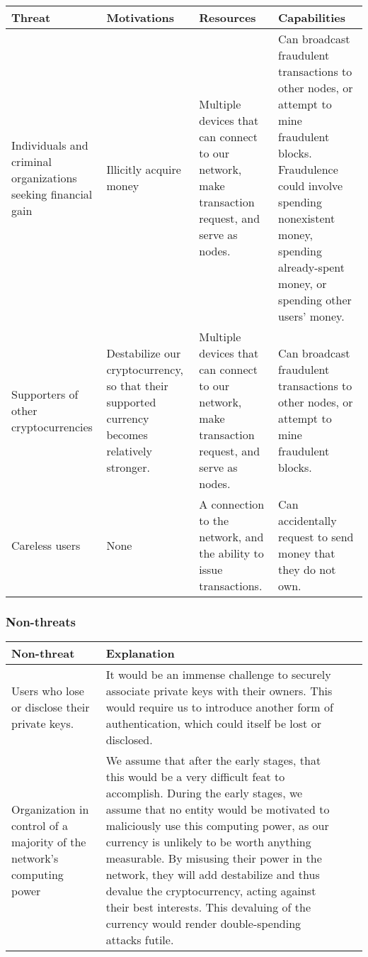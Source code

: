\documentclass[12pt]{article}
\begin{document}
\begin{tabulary}{\linewidth}{|L|L|L|L|}
\hline
\textbf{Threat} & \textbf{Motivations} & \textbf{Resources} & \textbf{Capabilities} \\
\hline
Individuals and criminal organizations seeking financial gain & Illicitly acquire money & Multiple devices that can connect to our network, make transaction request, and serve as nodes. & Can broadcast fraudulent transactions to other nodes, or attempt to mine fraudulent blocks. Fraudulence could involve spending nonexistent money, spending already-spent money, or spending other users' money. \\
\hline
Supporters of other cryptocurrencies & Destabilize our cryptocurrency, so that their supported currency becomes relatively stronger. & Multiple devices that can connect to our network, make transaction request, and serve as nodes. & Can broadcast fraudulent transactions to other nodes, or attempt to mine fraudulent blocks. \\
\hline
Careless users & None & A connection to the network, and the ability to issue transactions. & Can accidentally request to send money that they do not own. \\
\hline
\end{tabulary}

\subsubsection*{Non-threats}

\begin{tabulary}{\linewidth}{|L|L|L|L|}
\hline
\textbf{Non-threat} & \textbf{Explanation}\\
\hline
Users who lose or disclose their private keys. & It would be an immense challenge to securely associate private keys with their owners. This would require us to introduce another form of authentication, which could itself be lost or disclosed. \\
\hline
Organization in control of a majority of the network's computing power & We assume that after the early stages, that this would be a very difficult feat to accomplish. During the early stages, we assume that no entity would be motivated to maliciously use this computing power, as our currency is unlikely to be worth anything measurable. By misusing their power in the network, they will add destabilize and thus devalue the cryptocurrency, acting against their best interests. This devaluing of the currency would render double-spending attacks futile. \\
\hline
\end{tabulary}
\end{document}
